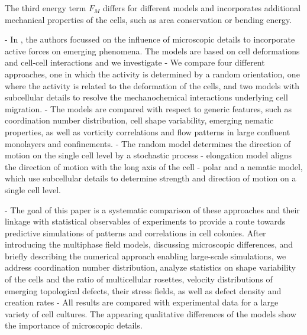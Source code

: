 The third energy term $F_M$ differs for different models and incorporates additional mechanical properties of the cells, such as area conservation or bending energy.%

- In \cite{wenzel2021}, the authors focussed on the influence of microscopic details to incorporate active forces on emerging phenomena.
The models are based on cell deformations and cell-cell interactions and we investigate 
- We compare four different approaches, one in which the activity is determined by a random orientation, one where the activity is related to the deformation of
the cells, and two models with subcellular details to resolve the mechanochemical interactions underlying cell
migration.
- The models are compared with respect to generic features, such as coordination number distribution,
cell shape variability, emerging nematic properties, as well as vorticity correlations and flow patterns in large
confluent monolayers and confinements. 
- The random model determines the direction of motion on the single cell level by a stochastic process
- elongation model aligns the direction of motion with the long axis of the cell
- polar and a nematic model, which use subcellular details to determine strength and direction of motion on a single cell level.

- The goal of this paper is a systematic comparison of these approaches and their linkage with statistical observables of experiments to provide a route towards predictive simulations of patterns and correlations in cell colonies. After introducing the multiphase field models, discussing microscopic differences, and briefly describing the numerical approach enabling large-scale simulations, we address coordination number distribution, analyze statistics on shape variability of the cells and the ratio of multicellular rosettes, velocity distributions of emerging topological defects, their stress fields, as well as defect density and creation rates
- All results are compared with experimental data for a large variety of cell cultures. The appearing qualitative differences of the models show the importance of microscopic details.

